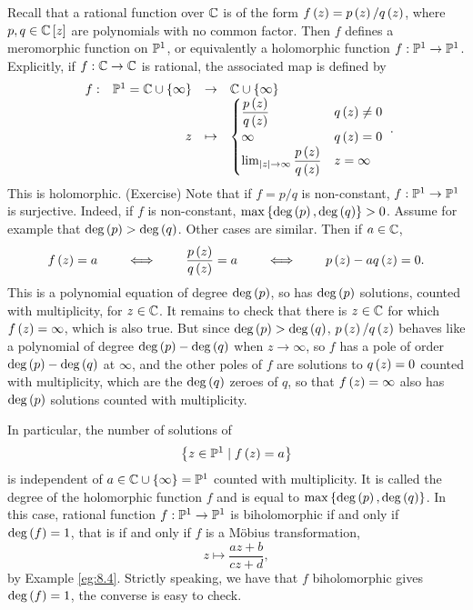 \begin{example}
Recall that a rational function over $ \C $ is of the form $ f\rb{z} = p\rb{z} / q\rb{z} $, where $ p, q \in \C\sb{z} $ are polynomials with no common factor. Then $ f $ defines a meromorphic function on $ \P^1 $, or equivalently a holomorphic function $ f : \P^1 \to \P^1 $. Explicitly, if $ f : \C \to \C $ is rational, the associated map is defined by
$$ \function[f]{\P^1 = \C \cup \cb{\infty}}{\C \cup \cb{\infty}}{z}{
\begin{cases}
\dfrac{p\rb{z}}{q\rb{z}} & q\rb{z} \ne 0 \\
\infty & q\rb{z} = 0 \\
\lim_{\abs{z} \to \infty} \dfrac{p\rb{z}}{q\rb{z}} & z = \infty
\end{cases}
}. $$
This is holomorphic. (Exercise) Note that if $ f = p / q $ is non-constant, $ f : \P^1 \to \P^1 $ is surjective. Indeed, if $ f $ is non-constant, $ \max\cb{\deg\rb{p}, \deg\rb{q}} > 0 $. Assume for example that $ \deg\rb{p} > \deg\rb{q} $. Other cases are similar. Then if $ a \in \C $,
$$ f\rb{z} = a \qquad \iff \qquad \dfrac{p\rb{z}}{q\rb{z}} = a \qquad \iff \qquad p\rb{z} - aq\rb{z} = 0. $$
This is a polynomial equation of degree $ \deg\rb{p} $, so has $ \deg\rb{p} $ solutions, counted with multiplicity, for $ z \in \C $. It remains to check that there is $ z \in \C $ for which $ f\rb{z} = \infty $, which is also true. But since $ \deg\rb{p} > \deg\rb{q} $, $ p\rb{z} / q\rb{z} $ behaves like a polynomial of degree $ \deg\rb{p} - \deg\rb{q} $ when $ z \to \infty $, so $ f $ has a pole of order $ \deg\rb{p} - \deg\rb{q} $ at $ \infty $, and the other poles of $ f $ are solutions to $ q\rb{z} = 0 $ counted with multiplicity, which are the $ \deg\rb{q} $ zeroes of $ q $, so that $ f\rb{z} = \infty $ also has $ \deg\rb{p} $ solutions counted with multiplicity.
\end{example}

\pagebreak

In particular, the number of solutions of
$$ \cb{z \in \P^1 \mid f\rb{z} = a} $$
is independent of $ a \in \C \cup \cb{\infty} = \P^1 $ counted with multiplicity. It is called the degree of the holomorphic function $ f $ and is equal to $ \max\cb{\deg\rb{p}, \deg\rb{q}} $. In this case, rational function $ f : \P^1 \to \P^1 $ is biholomorphic if and only if $ \deg\rb{f} = 1 $, that is if and only if $ f $ is a M\"obius transformation,
$$ z \mapsto \dfrac{az + b}{cz + d}, $$
by Example \ref{eg:8.4}. Strictly speaking, we have that $ f $ biholomorphic gives $ \deg\rb{f} = 1 $, the converse is easy to check.

